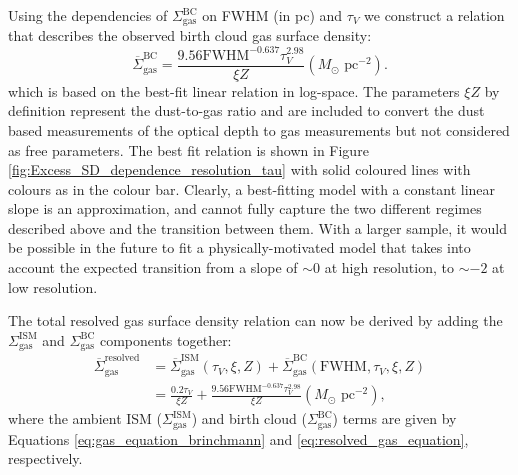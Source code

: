 \documentclass[fleqn,usenatbib]{mnras}
\begin{document}
Using the dependencies of $\Sigma_{\textrm{gas}}^{\textrm{BC}}$ on FWHM (in pc) and $\tau_V$ we construct a relation that describes the observed birth cloud gas surface density:
\begin{equation}
\label{eq:gas_equation_correction}
    \overline{\Sigma}_{\textrm{gas}}^{\textrm{BC}} = \frac{9.56\textrm{FWHM}^{-0.637}\tau_{V}^{2.98}}{\xi Z} (M_{\odot}\textrm{ pc}^{-2}).
\end{equation}
which is based on the best-fit linear relation in log-space. The parameters $\xi Z$ by definition represent the dust-to-gas ratio \citep{brinchmann2013} and are included to convert the dust based measurements of the optical depth to gas measurements but not considered as free parameters. The best fit relation is shown in Figure \ref{fig:Excess_SD_dependence_resolution_tau} with solid coloured lines with colours as in the colour bar. Clearly, a best-fitting model with a constant linear slope is an approximation, and cannot fully capture the two different regimes described above and the transition between them. With a larger sample, it would be possible in the future to fit a physically-motivated model that takes into account the expected transition from a slope of $\sim 0$ at high resolution, to $\sim -2$ at low resolution. 

The total resolved gas surface density relation can now be derived by adding the $\Sigma_{\textrm{gas}}^{\textrm{ISM}}$ and $\Sigma_{\textrm{gas}}^{\textrm{BC}}$ components together:
\begin{equation}
\label{eq:resolved_gas_equation}
\begin{split}
\overline{\Sigma}_{\textrm{gas}}^{\textrm{resolved}} & = \overline{\Sigma}_{\textrm{gas}}^{\textrm{ISM}}(\tau_{V}, \xi, Z) + \overline{\Sigma}_{\textrm{gas}}^{\textrm{BC}}(\textrm{FWHM}, \tau_{V}, \xi, Z) \\
 & =  \frac{0.2\tau_{V}}{\xi Z} + \frac{9.56\textrm{FWHM}^{-0.637}\tau_{V}^{2.98}}{\xi Z} (M_{\odot}\textrm{ pc}^{-2}), 
\end{split}
\end{equation}
where the ambient ISM ($\Sigma_{\textrm{gas}}^{\textrm{ISM}}$) and birth cloud ($\Sigma_{\textrm{gas}}^{\textrm{BC}}$) terms are given by Equations \ref{eq:gas_equation_brinchmann} and \ref{eq:resolved_gas_equation}, respectively. 
\end{document}
